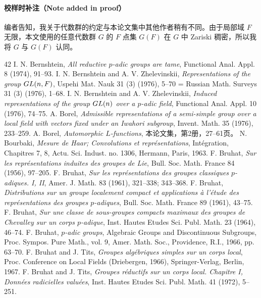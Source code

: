 \paragraph*{校样时补注（Note added in proof）}
编者告知，我关于代数群的约定与本论文集中其他作者稍有不同。由于局部域 $F$ 无限，本文使用的任意代数群 $G$ 的 $F$ 点集 $G(F)$ 在 $G$ 中 Zariski 稠密，所以我将 $G$ 与 $G(F)$ 认同。
\begin{thebibliography}{42}
 I. N. Bernshtein, \emph{All reductive $p$-adic groups are tame}, Functional Anal. Appl. 8 (1974), 91--93.
 I. N. Bernshtein and A. V. Zhelevinskii, \emph{Representations of the group $GL(n,F)$}, Uspehi Mat. Nauk 31 (3) (1976), 5--70 = Russian Math. Surveys 31 (3) (1976), 1--68.
 I. N. Bernshtein and A. V. Zhelevinskii, \emph{Induced representations of the group $GL(n)$ over a $p$-adic field}, Functional Anal. Appl. 10 (1976), 74--75.
 A. Borel, \emph{Admissible representations of a semi-simple group over a local field with vectors fixed under an Iwahori subgroup}, Invent. Math. 35 (1976), 233--259.
 A. Borel, \emph{Automorphic $L$-functions}, 本论文集，第2册，27--61页。
 N. Bourbaki, \emph{Mesure de Haar; Convolutions et représentations}, Intégration, Chapitres 7, 8, Actu. Sci. Indust. no. 1306, Hermann, Paris, 1963.
 F. Bruhat, \emph{Sur les représentations induites des groupes de Lie}, Bull. Soc. Math. France 84 (1956), 97--205.
 F. Bruhat, \emph{Sur les représentations des groupes classiques $p$-adiques. I, II}, Amer. J. Math. 83 (1961), 321--338; 343--368.
 F. Bruhat, \emph{Distributions sur un groupe localement compact et applications à l'étude des représentations des groupes $p$-adiques}, Bull. Soc. Math. France 89 (1961), 43--75.
 F. Bruhat, \emph{Sur une classe de sous-groupes compacts maximaux des groupes de Chevalley sur un corps $p$-adique}, Inst. Hautes Etudes Sci. Publ. Math. 23 (1964), 46--74.
 F. Bruhat, \emph{$p$-adic groups}, Algebraic Groups and Discontinuous Subgroups, Proc. Sympos. Pure Math., vol. 9, Amer. Math. Soc., Providence, R.I., 1966, pp. 63--70.
 F. Bruhat and J. Tits, \emph{Groupes algébriques simples sur un corps local}, Proc. Conference on Local Fields (Driebergen, 1966), Springer-Verlag, Berlin, 1967.
 F. Bruhat and J. Tits, \emph{Groupes réductifs sur un corps local. Chapitre I, Données radicielles valuées}, Inst. Hautes Etudes Sci. Publ. Math. 41 (1972), 5--251.

\end{thebibliography}

